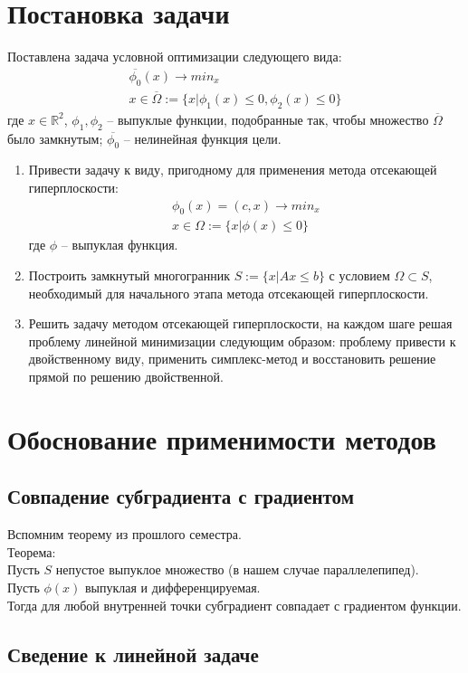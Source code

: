 \documentclass[main.tex]{subfiles}
\begin{document}
	
\section{Постановка задачи}
Поставлена задача условной оптимизации следующего вида:
\begin{gather*}
\overline{\phi_0}(x) \rightarrow min_{x} \\
x \in \overline{\varOmega} := \{x|\phi_1(x) \le 0, \phi_2(x) \le 0\} 
\end{gather*}
где $x \in \mathds{R}^2$, $\phi_1, \phi_2$ -- выпуклые функции, подобранные так, чтобы множество $\overline{\varOmega}$ было замкнутым; $\overline{\phi_0}$ -- нелинейная функция цели.\\
\begin{enumerate}
	\item Привести задачу к виду, пригодному для применения метода отсекающей гиперплоскости:
	\begin{gather*}
	\phi_0(x) = (c, x) \rightarrow min_{x} \\
	x \in \varOmega := \{x|\phi(x) \le 0\} 
	\end{gather*}
	где $\phi$ -- выпуклая функция.
	\item Построить замкнутый многогранник $S:=\{x|Ax\le b\}$ с условием $\varOmega \subset S$, необходимый для начального этапа метода отсекающей гиперплоскости.
	\item Решить задачу методом отсекающей гиперплоскости, на каждом шаге решая проблему линейной минимизации следующим образом: проблему привести к двойственному виду, применить симплекс-метод и восстановить решение прямой по решению двойственной.
\end{enumerate}

\section{Обоснование применимости методов}
\subsection{Совпадение субградиента с градиентом}
Вспомним теорему из прошлого семестра.\\
Теорема:\\
Пусть $S$ непустое выпуклое множество (в нашем случае параллелепипед).\\
Пусть $\phi(x)$ выпуклая и дифференцируемая.\\
Тогда для любой внутренней точки субградиент совпадает с градиентом функции.
\subsection{Сведение к линейной задаче}

\end{document}
